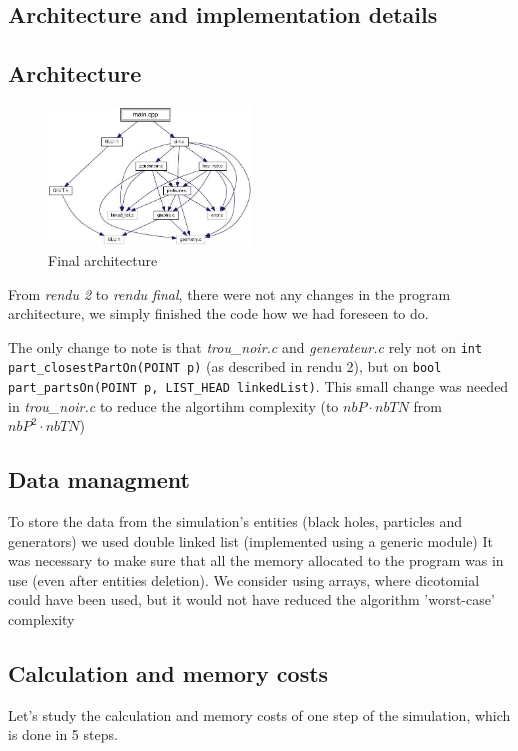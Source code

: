 \documentclass[a4paper]{article} %
\begin{document}
\begin{multicols*}{2}
\section{Architecture and implementation details}

\subsection{Architecture}
\begin{figure}[H]
\centering
\includegraphics[width=0.48\textwidth]{architecture.jpg}
\caption{Final architecture}
\end{figure}

From \emph{rendu 2} to \emph{rendu final}, there were not any changes in the
program architecture, we simply finished the code how we had foreseen to do.

The only change to note is that \emph{trou\_noir.c} and \emph{generateur.c} rely not on \texttt{int part\_closestPartOn(POINT p)}
(as described in rendu 2), but on \texttt{bool part\_partsOn(POINT p, LIST\_HEAD linkedList)}.
This small change was needed in \emph{trou\_noir.c} to reduce the algortihm complexity (to $nbP \cdot nbTN$ from $nbP^2 \cdot nbTN$)

\subsection{Data managment}
To store the data from the simulation's entities (black holes, particles and generators)
we used double linked list (implemented using a generic module)
It was necessary to make sure that all the memory allocated to the program was in use (even after entities deletion).
We consider using arrays, where dicotomial could have been used, but it would not have reduced the algorithm 'worst-case' complexity 

\subsection{Calculation and memory costs}
Let's study the calculation and memory costs of one step of the simulation,
which is done in 5 steps.


\end{multicols*}
\end{document}
